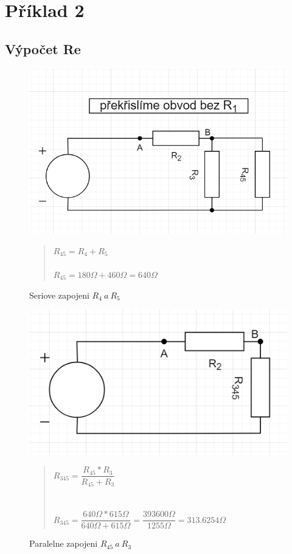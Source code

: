 \section{Příklad 2}
\subsection{Výpočet Re}
\begin{figure}[H]
    \centering
    \includegraphics[scale=0.5]{picturesFor2Uloha/1.png}
    \caption{Seriove zapojeni $R_4 \: a \: R_5$}
    \label{fig:Serial_resistor_R45}
    \begin{quote}
    \centering
    $R_{45} = R_4 + R_5$ \\~\\
    $R_{45} = 180\Omega + 460\Omega = 640\Omega$
    \end{quote}
\end{figure}

\begin{figure}[H]
    \centering
    \includegraphics[scale=0.5]{picturesFor2Uloha/2.png}
    \caption{Paralelne zapojeni $R_{45} \: a \: R_3$}
    \label{fig:Paralel_resistor_R345}
    \begin{quote}
    \centering
    $R_{345} = \dfrac{R_{45} * R_3}{R_{45} + R_3}$ \\~\\~\\
    $R_{345} = \dfrac{640\Omega * 615\Omega}{640\Omega + 615\Omega} = \dfrac{393 600\Omega}{1255\Omega} = 313.6254\Omega$
    \end{quote}
\end{figure}

